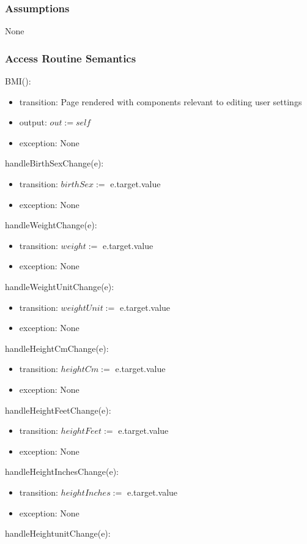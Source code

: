 \documentclass[12pt, titlepage]{article}
\begin{document}
\subsubsection{Assumptions}
None
\subsubsection{Access Routine Semantics}
\noindent BMI():
\begin{itemize}
	\item transition: Page rendered with components relevant to editing user 
	settings
	\item output: $out := self$
	\item exception: None
\end{itemize}
\noindent handleBirthSexChange(e):
\begin{itemize}
	\item transition: $birthSex :=$ e.target.value
	\item exception: None
\end{itemize}
\noindent handleWeightChange(e):
\begin{itemize}
	\item transition: $weight :=$ e.target.value
	\item exception: None
\end{itemize}
\noindent handleWeightUnitChange(e):
\begin{itemize}
	\item transition: $weightUnit :=$ e.target.value
	\item exception: None
\end{itemize}
\noindent handleHeightCmChange(e):
\begin{itemize}
	\item transition: $heightCm :=$ e.target.value
	\item exception: None
\end{itemize}
\noindent handleHeightFeetChange(e):
\begin{itemize}
	\item transition: $heightFeet :=$ e.target.value
	\item exception: None
\end{itemize}
\noindent handleHeightInchesChange(e):
\begin{itemize}
	\item transition: $heightInches :=$ e.target.value
	\item exception: None
\end{itemize}
\noindent handleHeightunitChange(e):
\end{document}
